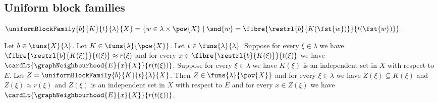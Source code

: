 \subsection{Uniform block families}

\begin{definition}\label{uniform_block_family}
    $\uniformBlockFamily{b}{K}{t}{\lambda}{X}
        =\{w\in\lambda\times\pow{X}\mid
            \snd{w}=\fibre{\restrl{b}{K(\fst{w})}}{t(\fst{w})}\}$.
\end{definition}

\begin{theorem}\label{uniform_independent_block_family}
    Let $b\in\funs{X}{\lambda}$.
    Let $K\in\funs{\lambda}{\pow{X}}$.
    Let $t\in\funs{\lambda}{\lambda}$.
    Suppose for every $\xi\in\lambda$ we have
        $\fibre{\restrl{b}{K(\xi)}}{t(\xi)}\approx r(\xi)$ and
        for every $x\in\fibre{\restrl{b}{K(\xi)}}{t(\xi)}$ we have
            $\cardLt{\graphNeighbourhood{E}{x}{X}}{r(t(\xi))}$.
    Suppose for every $\xi\in\lambda$ we have
        $K(\xi)$ is an independent set in $X$ with respect to $E$.
    Let $Z=\uniformBlockFamily{b}{K}{t}{\lambda}{X}$.
    Then $Z\in\funs{\lambda}{\pow{X}}$ and for every $\xi\in\lambda$
        we have $Z(\xi)\subseteq K(\xi)$ and $Z(\xi)\approx r(\xi)$ and
        $Z(\xi)$ is an independent set in $X$ with respect to $E$ and
        for every $x\in Z(\xi)$ we have
            $\cardLt{\graphNeighbourhood{E}{x}{X}}{r(t(\xi))}$.
\end{theorem}
